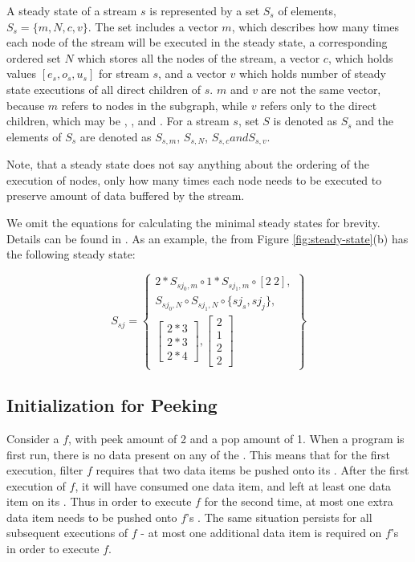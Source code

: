 A steady state of a stream $s$ is represented by a set $S_s$ of
elements, $S_s = \{m, N, c, v\}$. The set includes a vector $m$,
which describes how many times each {\StreamIt} node of the stream
will be executed in the steady state, a corresponding ordered set
$N$ which stores all the nodes of the stream, a vector $c$, which
holds values $[e_s, o_s, u_s]$ for stream $s$, and a vector $v$
which holds number of steady state executions of all direct
children of $s$. $m$ and $v$ are not the same vector, because $m$
refers to nodes in the subgraph, while $v$ refers only to the
direct children, which may be {\filters}, {\pipelines},
{\splitters} and {\feedbackloops}. For a stream $s$, set $S$ is
denoted as $S_s$ and the elements of $S_s$ are denoted as
$S_{s,m}$, $S_{s,N}$, $S_{s,c} and S_{s,v}$.

Note, that a steady state does not say anything about the ordering
of the execution of nodes, only how many times each node needs to
be executed to preserve amount of data buffered by the stream.

We omit the equations for calculating the minimal steady states
for brevity. Details can be found in \cite{karczma-thesis}. As an
example, the \splitjoin from Figure \ref{fig:steady-state}(b) has
the following steady state:

\begin{displaymath}
S_{sj} = \left\{
\begin{array}{c}
2 * S_{sj_0, m} \circ 1 * S_{sj_1, m} \circ [2\ 2], \\
S_{sj_0, N} \circ S_{sj_1, N} \circ \{sj_s, sj_j\}, \\
\left[
\begin{array}{c}
2 * 3 \\ 2 * 3 \\ 2 * 4
\end{array}
\right], \left[
\begin{array}{c}
2 \\ 1 \\ 2 \\ 2
\end{array}\right]
\end{array} \right\}
\end{displaymath}

\subsection{Initialization for Peeking}
\label{sec:init-peeking}

Consider a {\filter} $f$, with peek amount of 2 and a pop amount of
1.  When a {\StreamIt} program is first run, there is no data
present on any of the {{\Channels}}.  This means that for the first
execution, filter $f$ requires that two data items be pushed onto
its {\Input} {{\Channel}}.  After the first execution of $f$, it will
have consumed one data item, and left at least one data item on
its {\Input} {{\Channel}}.  Thus in order to execute $f$ for the second
time, at most one extra data item needs to be pushed onto $f$'s
{\Input} {{\Channel}}.  The same situation persists for all subsequent
executions of $f$ - at most one additional data item is required
on $f$'s {\Input} {{\Channel}} in order to execute $f$.

